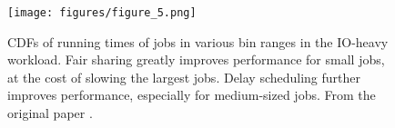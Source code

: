 \begin{figure}
  \centering
  \texttt{[image: figures/figure\_5.png]}
  \caption{CDFs of running times of jobs in various bin ranges in the IO-heavy workload. Fair sharing greatly improves performance for small jobs, at the cost of slowing the largest jobs. Delay scheduling further improves performance, especially for medium-sized jobs. From the original paper \cite{ds}.}
  \label{fig:original_5}
\end{figure}
